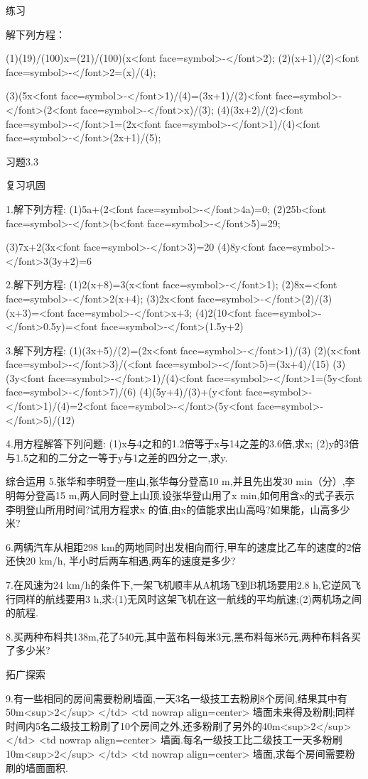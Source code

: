 \beginexercise
练习

解下列方程：

(1)(19)/(100)x=(21)/(100)(x<font face=symbol>-</font>2);
(2)(x+1)/(2)<font face=symbol>-</font>2=(x)/(4);

(3)(5x<font face=symbol>-</font>1)/(4)=(3x+1)/(2)<font face=symbol>-</font>(2<font face=symbol>-</font>x)/(3);
(4)(3x+2)/(2)<font face=symbol>-</font>1=(2x<font face=symbol>-</font>1)/(4)<font face=symbol>-</font>(2x+1)/(5);

习题3.3

复习巩固

1.解下列方程:
(1)5a+(2<font face=symbol>-</font>4a)=0;
(2)25b<font face=symbol>-</font>(b<font face=symbol>-</font>5)=29;

(3)7x+2(3x<font face=symbol>-</font>3)=20
(4)8y<font face=symbol>-</font>3(3y+2)=6

2.解下列方程:
(1)2(x+8)=3(x<font face=symbol>-</font>1);
(2)8x=<font face=symbol>-</font>2(x+4);
(3)2x<font face=symbol>-</font>(2)/(3)(x+3)=<font face=symbol>-</font>x+3;
(4)2(10<font face=symbol>-</font>0.5y)=<font face=symbol>-</font>(1.5y+2)

3.解下列方程:
(1)(3x+5)/(2)=(2x<font face=symbol>-</font>1)/(3)
(2)(x<font face=symbol>-</font>3)/(<font face=symbol>-</font>5)=(3x+4)/(15)
(3)(3y<font face=symbol>-</font>1)/(4)<font face=symbol>-</font>1=(5y<font face=symbol>-</font>7)/(6)
(4)(5y+4)/(3)+(y<font face=symbol>-</font>1)/(4)=2<font face=symbol>-</font>(5y<font face=symbol>-</font>5)/(12)

4.用方程解答下列问题:
(1)x与4之和的1.2倍等于x与14之差的3.6倍,求x;
(2)y的3倍与1.5之和的二分之一等于y与1之差的四分之一,求y.

综合运用
5.张华和李明登一座山,张华每分登高10 m,并且先出发30 min（分）,李明每分登高15 m,两人同时登上山顶,设张华登山用了x min,如何用含x的式子表示李明登山所用时间?试用方程求x 的值,由x的值能求出山高吗?如果能，山高多少米?

6.两辆汽车从相距298 km的两地同时出发相向而行,甲车的速度比乙车的速度的2倍还快20 km/h, 半小时后两车相遇,两车的速度是多少?

7.在风速为24 km/h的条件下,一架飞机顺丰从A机场飞到B机场要用2.8 h,它逆风飞行同样的航线要用3 h,求:(1)无风时这架飞机在这一航线的平均航速;(2)两机场之间的航程.

8.买两种布料共138m,花了540元,其中蓝布料每米3元,黑布料每米5元,两种布料各买了多少米?

拓广探索


9.有一些相同的房间需要粉刷墙面,一天3名一级技工去粉刷8个房间,结果其中有50m<sup>2</sup>
</td>
<td nowrap align=center>
   墙面未来得及粉刷;同样时间内5名二级技工粉刷了10个房间之外,还多粉刷了另外的40m<sup>2</sup>
</td>
<td nowrap align=center>
  墙面.每名一级技工比二级技工一天多粉刷10m<sup>2</sup>
</td>
<td nowrap align=center>
  墙面,求每个房间需要粉刷的墙面面积.

